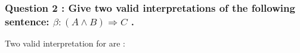 \documentclass[a4paper,10pt]{article}
\begin{document}
\subsubsection*{Question 2 : Give two valid interpretations of the following sentence: $\beta : (A \wedge B) \Rightarrow C$ .}
Two valid interpretation for \beta are :
\begin{tabular}{|c|c|c|}
  \hline

\end{tabular}
\end{document}
